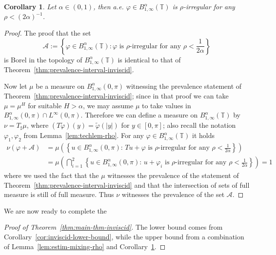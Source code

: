 \documentclass[11pt,oneside,reqno]{amsart}
\newcommand{\assign}{:=}
\newtheorem{corollary}[theorem]{Corollary}
\numberwithin{equation}{section}
\begin{document}
\begin{corollary}
  \label{cor:prevalence-periodic-inviscid}Let $\alpha \in (0, 1)$, then a.e.
  $\varphi \in B^{\alpha}_{1, \infty} (\mathbb{T})$ is $\rho$-irregular for
  any $\rho < (2 \alpha)^{- 1}$.
\end{corollary}

\begin{proof}
  The proof that the set
  \[ \mathcal{A} \assign \left\{ \varphi \in B^{\alpha}_{1, \infty}
     (\mathbb{T}) : \varphi \text{ is } \rho \text{-irregular for any } \rho <
     \frac{1}{2 \alpha}  \right\} \]
  is Borel in the topology of $B^{\alpha}_{1, \infty} (\mathbb{T})$ is
  identical to that of Theorem~\ref{thm:prevalence-interval-inviscid}.
  
  Now let $\mu$ be a measure on $B^{\alpha}_{1, \infty} (0, \pi)$ witnessing
  the prevalence statement of Theorem~\ref{thm:prevalence-interval-inviscid};
  since in that proof we can take $\mu = \mu^H$ for suitable $H > \alpha$, we
  may assume $\mu$ to take values in $B^{\alpha}_{1, \infty} (0, \pi) \cap
  L^{\infty} (0, \pi)$. Therefore we can define a measure on $B^{\alpha}_{1,
  \infty} (\mathbb{T})$ by $\nu = T_{\sharp} \mu$, where $(T \tilde{\varphi})
  (y) = \tilde{\varphi} (| y |)$ for $y \in [0, \pi]$; also recall the
  notation $\varphi_1, \varphi_2$ from Lemma~\ref{lem:techlem-rho}. For any
  $\varphi \in B^{\alpha}_{1, \infty} (\mathbb{T})$ it holds
%  
  \begin{align*}
    \nu (\varphi + \mathcal{A}) & = \mu \left( \left\{ u \in B^{\alpha}_{1,
    \infty} (0, \pi) : \, T u + \varphi \text{ is } \rho \text{-irregular for
    any } \rho < \frac{1}{2 \alpha}  \right\} \right)\\
    & = \mu \left( \bigcap_{i = 1}^2 \left\{ u \in B^{\alpha}_{1, \infty} (0,
    \pi) : \, u + \varphi_i \text{ is } \rho \text{-irregular for any } \rho <
    \frac{1}{2 \alpha}  \right\} \right)
    = 1
  \end{align*}
%  
  where we used the fact that the $\mu$ witnesses the prevalence of the
  statement of Theorem~\ref{thm:prevalence-interval-inviscid} and that the
  intersection of sets of full measure is still of full measure. Thus $\nu$
  witnesses the prevalence of the set $\mathcal{A}$.
\end{proof}

We are now ready to complete the

\begin{proof}[Proof of Theorem~\ref{thm:main-thm-inviscid}]
  The lower bound comes from Corollary~\ref{cor:inviscid-lower-bound}, while
  the upper bound from a combination of Lemma~\ref{lem:estim-mixing-rho} and
  Corollary~\ref{cor:prevalence-periodic-inviscid}.
\end{proof}
\end{document}
